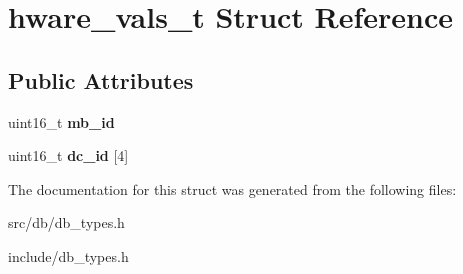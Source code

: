 \hypertarget{structhware__vals__t}{
\section{hware\_\-vals\_\-t Struct Reference}
\label{structhware__vals__t}
}
\subsection*{Public Attributes}
\begin{DoxyCompactItemize}
\item 
\hypertarget{structhware__vals__t_a9171fe3baa5c4d3be299f31fabf8d6f1}{
uint16\_\-t {\bfseries mb\_\-id}}
\label{structhware__vals__t_a9171fe3baa5c4d3be299f31fabf8d6f1}

\item 
\hypertarget{structhware__vals__t_ae444d19c8ee03173e0fa5ca26205089d}{
uint16\_\-t {\bfseries dc\_\-id} \mbox{[}4\mbox{]}}
\label{structhware__vals__t_ae444d19c8ee03173e0fa5ca26205089d}

\end{DoxyCompactItemize}


The documentation for this struct was generated from the following files:\begin{DoxyCompactItemize}
\item 
src/db/db\_\-types.h\item 
include/db\_\-types.h\end{DoxyCompactItemize}
